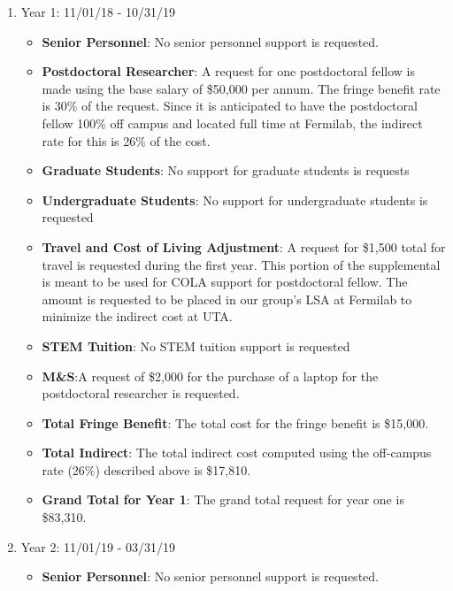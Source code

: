 \begin{enumerate}
\begin{itemize}
\end{itemize}

\item{Year 1: 11/01/18 - 10/31/19}
\begin{itemize}[noitemsep,nolistsep]
\item{{\bf Senior Personnel}: No senior personnel support is requested.}

\item {{\bf Postdoctoral Researcher}: A request for one postdoctoral fellow is made using the base salary of \$50,000 per annum.  The fringe benefit rate is 30\% of the request. Since it is anticipated to have the postdoctoral fellow 100\% off campus and located full time at Fermilab, the indirect rate for this is 26\% of the cost.} 


\item{{\bf Graduate Students}: No support for graduate students is requests}

\item {{\bf Undergraduate Students}: No support for undergraduate students is requested}

\item{{\bf Travel and Cost of Living Adjustment}: A request for \$1,500 total for travel is requested during the first year.  This portion of the supplemental is meant to be used for COLA support for postdoctoral fellow. The amount is requested to be placed in our group’s LSA at Fermilab to minimize the indirect cost at UTA.}

\item {{\bf STEM Tuition}: No STEM tuition support is requested}

\item {{\bf M\&S}:A request of \$2,000 for the purchase of a laptop for the postdoctoral researcher is requested.}

\item {{\bf Total Fringe Benefit}: The total cost for the fringe benefit is \$15,000.}

\item {{\bf Total Indirect}: The total indirect cost computed using the off-campus rate (26\%) described above is \$17,810.}

\item {{\bf Grand Total for Year 1}: The grand total request for year one is \$83,310.}

\end{itemize}

\item{Year 2: 11/01/19 - 03/31/19}
\begin{itemize}[noitemsep,nolistsep]
\item{{\bf Senior Personnel}: No senior personnel support is requested.}


\end{itemize}
\end{enumerate}
